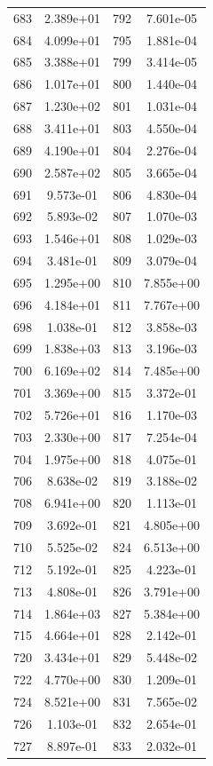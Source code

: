 \documentclass[12pt]{article}
\begin{document}
\begin{longtable}{@{}cccc@{}}
683 & 2.389e+01 & 792 & 7.601e-05 \\
684 & 4.099e+01 & 795 & 1.881e-04 \\
685 & 3.388e+01 & 799 & 3.414e-05 \\
686 & 1.017e+01 & 800 & 1.440e-04 \\
687 & 1.230e+02 & 801 & 1.031e-04 \\
688 & 3.411e+01 & 803 & 4.550e-04 \\
689 & 4.190e+01 & 804 & 2.276e-04 \\
690 & 2.587e+02 & 805 & 3.665e-04 \\
691 & 9.573e-01 & 806 & 4.830e-04 \\
692 & 5.893e-02 & 807 & 1.070e-03 \\
693 & 1.546e+01 & 808 & 1.029e-03 \\
694 & 3.481e-01 & 809 & 3.079e-04 \\
695 & 1.295e+00 & 810 & 7.855e+00 \\
696 & 4.184e+01 & 811 & 7.767e+00 \\
698 & 1.038e-01 & 812 & 3.858e-03 \\
699 & 1.838e+03 & 813 & 3.196e-03 \\
700 & 6.169e+02 & 814 & 7.485e+00 \\
701 & 3.369e+00 & 815 & 3.372e-01 \\
702 & 5.726e+01 & 816 & 1.170e-03 \\
703 & 2.330e+00 & 817 & 7.254e-04 \\
704 & 1.975e+00 & 818 & 4.075e-01 \\
706 & 8.638e-02 & 819 & 3.188e-02 \\
708 & 6.941e+00 & 820 & 1.113e-01 \\
709 & 3.692e-01 & 821 & 4.805e+00 \\
710 & 5.525e-02 & 824 & 6.513e+00 \\
712 & 5.192e-01 & 825 & 4.223e-01 \\
713 & 4.808e-01 & 826 & 3.791e+00 \\
714 & 1.864e+03 & 827 & 5.384e+00 \\
715 & 4.664e+01 & 828 & 2.142e-01 \\
720 & 3.434e+01 & 829 & 5.448e-02 \\
722 & 4.770e+00 & 830 & 1.209e-01 \\
724 & 8.521e+00 & 831 & 7.565e-02 \\
726 & 1.103e-01 & 832 & 2.654e-01 \\
727 & 8.897e-01 & 833 & 2.032e-01 \\

\end{longtable}
\end{document}
